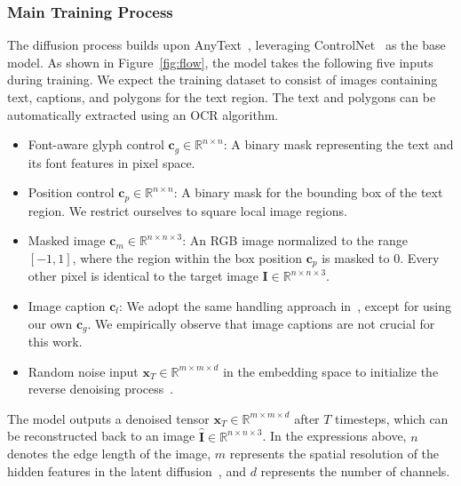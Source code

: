 \subsubsection{Main Training Process} \label{sec:train_input}
The diffusion process builds upon AnyText~\cite{tuo2023anytext}, leveraging ControlNet~\cite{zhang2023adding} as the base model. As shown in Figure~\ref{fig:flow}, the model takes the following five inputs during training. We expect the training dataset to consist of images containing text, captions, and polygons for the text region. The text and polygons can be automatically extracted using an OCR algorithm.
\begin{itemize}  
    \item Font-aware glyph control \(\boldsymbol{c}_{g} \in \mathbb{R}^{n \times n}\): A binary mask representing the text and its font features in pixel space.
    \item Position control \(\boldsymbol{c}_{p} \in \mathbb{R}^{n \times n}\): A binary mask for the bounding box of the text region.
    We restrict ourselves to square local image regions. %
    \item Masked image \(\boldsymbol{c}_{m} \in \mathbb{R}^{n \times n \times 3}\): An RGB image normalized to the range \([-1, 1]\), where the region within the box position \(\boldsymbol{c}_{p}\) is masked to 0. Every other pixel is identical to the target image $\boldsymbol{I} \in \mathbb{R}^{n \times n \times 3}$.
    \item Image caption \(\boldsymbol{c}_{l}\): We adopt the same handling approach in~\citet{tuo2023anytext}, except for using our own $\boldsymbol{c}_{g}$. We empirically observe that image captions are not crucial for this work.
    \item Random noise input \(\boldsymbol{x}_{T} \in \mathbb{R}^{m \times m \times d}\) in the embedding space to initialize the reverse denoising process~\cite{ho2020denoising}.
\end{itemize}  
The model outputs a denoised tensor $\boldsymbol{x}_{T} \in \mathbb{R}^{m \times m \times d}$ after $T$ timesteps, which can be reconstructed back to an image $\boldsymbol{\hat{I}} \in \mathbb{R}^{n \times n \times 3}$.
In the expressions above, $n$ denotes the edge length of the image, $m$ represents the spatial resolution of the hidden features in the latent diffusion~\cite{ho2020denoising}, and $d$ represents the number of channels. 

